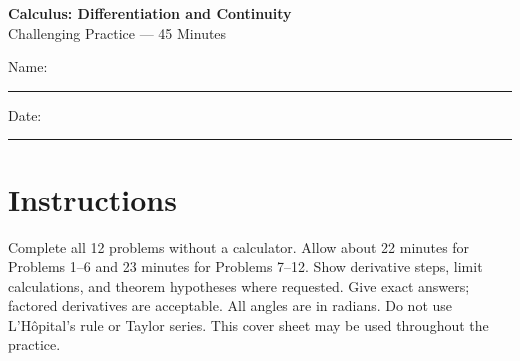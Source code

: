 \documentclass[11pt]{article}
\begin{document}
\begin{center}
  {\Large\textbf{Calculus: Differentiation and Continuity}}\\[3pt]
  {\large Challenging Practice --- 45 Minutes}
\end{center}

Name: \rule{2.7in}{0.4pt}\hfill Date: \rule{1.5in}{0.4pt}

\section*{Instructions}
Complete all 12 problems without a calculator. Allow about 22 minutes for
Problems 1--6 and 23 minutes for Problems 7--12. Show derivative steps,
limit calculations, and theorem hypotheses where requested. Give exact answers;
factored derivatives are acceptable. All angles are in radians.
Do not use L'H\^opital's rule or Taylor series. This cover sheet may be used
throughout the practice.
\end{document}
